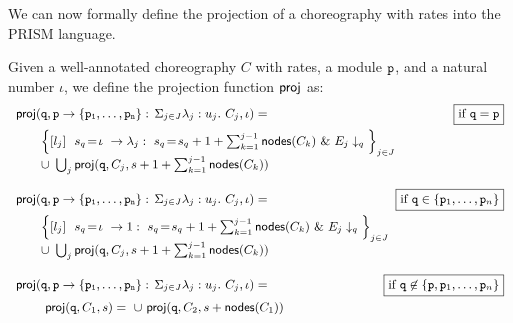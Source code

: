     We can now formally define the projection of a choreography with
    rates into the PRISM language.
    \begin{definition}\label{def:projCTMC} Given a
      well-annotated choreography $C$ with
      rates, a module $\mathtt{p}$, and a natural number $\iota$, we
      define the projection function $\mathsf{proj}$ as:
      \begin{displaymath}\small
        \begin{array}{lr}

          \proj (\role q,\interact{p}{\role p_1,\ldots,\role p_n}, \iota)= 
          &  \boxed{\text{if }\role q=\role p}\\[2mm]
          \qquad
          \Big\{\commandBase {l_j} {\ s_{q}\!=\! \iota} {\lambda_j:\ s_{q}\!=\!
          s_{q} +1+\sum_{k=1}^{j-1}\mathsf{nodes}({C_k})}\ \&\ \projE
          {E_j}q\Big\}_{j\in J}
          \\
          \qquad\cup\ \bigcup_{j} \proj (\role q, C_j, s+1+\sum_{k=1}^{j-1}\mathsf{nodes}({C_k}))
          \\\\

          \proj (\role q,\interact{p}{\role p_1,\ldots,\role p_n}, \iota)= 
          &  \!\!\!\!\!\! \!\!\!\!\!\!\boxed{\text{if }\role q\in\{\role p_1,\ldots,\role p_n\}}\\[2mm]
          \qquad
          \Big\{\commandBase {l_j} {\ s_{q}\!=\! \iota} {1:\ s_{q}\!=\!
          s_{q} +1+\sum_{k=1}^{j-1}\mathsf{nodes}({C_k})}\ \&\ \projE
          {E_j}q\Big\}_{j\in J}
          \\
          \qquad\cup\ \bigcup_{j} \proj (\role q, C_j, s+1+\sum_{k=1}^{j-1}\mathsf{nodes}({C_k}))
          \\\\

          \proj (\role q,\interact{p}{\role p_1,\ldots,\role p_n}, \iota)= 
          &  \!\!\!\!\!\! \!\!\!\!\!\!\boxed{\text{if }\role q\not\in\{\role p, 
            \role p_1,\ldots,\role p_n\}}\\[2mm]
          \qquad\ \proj (\role{q}, C_1, s)=
          \ \cup\
          \proj (\role{q}, C_2, s+\mathsf{nodes}(C_1))
          \\\\


\end{array}
\end{displaymath}
\end{definition}
